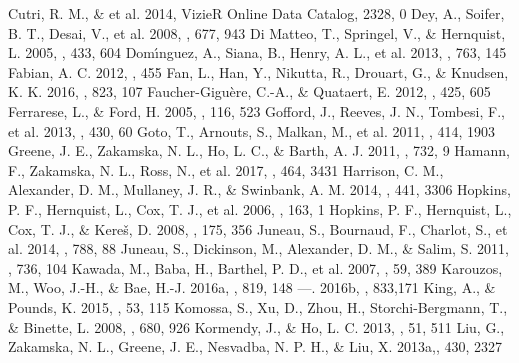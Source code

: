 \documentclass[twocolumn]{aastex6}
\begin{document}
\begin{thebibliography}{}
Cutri, R. M., \& et al. 2014, VizieR Online Data Catalog, 2328, 0
Dey, A., Soifer, B. T., Desai, V., et al. 2008, \apj, 677, 943
Di Matteo, T., Springel, V., \& Hernquist, L. 2005, \nat, 433, 604
Dom\'{\i}nguez, A., Siana, B., Henry, A. L., et al. 2013, \apj, 763, 145
Fabian, A. C. 2012, , 455
Fan, L., Han, Y., Nikutta, R., Drouart, G., \& Knudsen, K. K. 2016, \apj, 823, 107
Faucher-Gigu\`ere, C.-A., \& Quataert, E. 2012, \mnras, 425, 605
Ferrarese, L., \& Ford, H. 2005, \ssr, 116, 523
Gofford, J., Reeves, J. N., Tombesi, F., et al. 2013, \mnras, 430, 60
Goto, T., Arnouts, S., Malkan, M., et al. 2011, \mnras, 414, 1903
Greene, J. E., Zakamska, N. L., Ho, L. C., \& Barth, A. J. 2011, \apj, 732, 9
Hamann, F., Zakamska, N. L., Ross, N., et al. 2017, \mnras, 464, 3431
Harrison, C. M., Alexander, D. M., Mullaney, J. R., \& Swinbank, A. M. 2014, \mnras, 441, 3306
Hopkins, P. F., Hernquist, L., Cox, T. J., et al. 2006, \apjs, 163, 1
Hopkins, P. F., Hernquist, L., Cox, T. J., \& Kere\v{s}, D. 2008, \apjs, 175, 356
Juneau, S., Bournaud, F., Charlot, S., et al. 2014, \apj, 788, 88
Juneau, S., Dickinson, M., Alexander, D. M., \& Salim, S. 2011, \apj, 736, 104
Kawada, M., Baba, H., Barthel, P. D., et al. 2007, \pasj, 59, 389
Karouzos, M., Woo, J.-H., \& Bae, H.-J. 2016a, \apj, 819, 148
---. 2016b, \apj, 833,171
King, A., \& Pounds, K. 2015, \araa, 53, 115
Komossa, S., Xu, D., Zhou, H., Storchi-Bergmann, T., \& Binette, L. 2008, \apj, 680, 926
Kormendy, J., \& Ho, L. C. 2013, \araa, 51, 511
Liu, G., Zakamska, N. L., Greene, J. E., Nesvadba, N. P. H., \& Liu, X. 2013a,\mnras, 430, 2327

\end{thebibliography}
\end{document}
